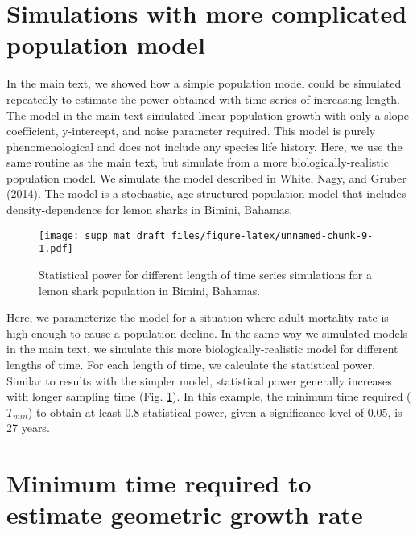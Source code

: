 \documentclass[12pt,]{article}
\begin{document}
\pagebreak

\section{Simulations with more complicated population
model}\label{simulations-with-more-complicated-population-model}

In the main text, we showed how a simple population model could be
simulated repeatedly to estimate the power obtained with time series of
increasing length. The model in the main text simulated linear
population growth with only a slope coefficient, y-intercept, and noise
parameter required. This model is purely phenomenological and does not
include any species life history. Here, we use the same routine as the
main text, but simulate from a more biologically-realistic population
model. We simulate the model described in White, Nagy, and Gruber
(2014). The model is a stochastic, age-structured population model that
includes density-dependence for lemon sharks in Bimini, Bahamas.

\begin{figure}[htbp]
\centering
\texttt{[image: supp\_mat\_draft\_files/figure-latex/unnamed-chunk-9-1.pdf]}
\caption{Statistical power for different length of time series
simulations for a lemon shark population in Bimini,
Bahamas.\label{fig:shark_example}}
\end{figure}

Here, we parameterize the model for a situation where adult mortality
rate is high enough to cause a population decline. In the same way we
simulated models in the main text, we simulate this more
biologically-realistic model for different lengths of time. For each
length of time, we calculate the statistical power. Similar to results
with the simpler model, statistical power generally increases with
longer sampling time (Fig. \ref{fig:shark_example}). In this example,
the minimum time required (\(T_{min}\)) to obtain at least 0.8
statistical power, given a significance level of 0.05, is 27 years.

\section{Minimum time required to estimate geometric growth
rate}\label{minimum-time-required-to-estimate-geometric-growth-rate}
\end{document}
